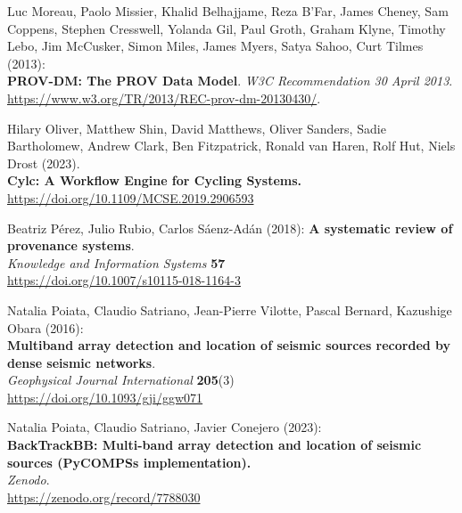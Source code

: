 \documentclass[10pt,letterpaper]{article}
\begin{document}
\begin{thebibliography}{10}
\begin{small}
Luc Moreau, Paolo Missier, Khalid Belhajjame, Reza B'Far, James Cheney, Sam Coppens, Stephen Cresswell, Yolanda Gil, Paul Groth, Graham Klyne, Timothy Lebo, Jim McCusker, Simon Miles, James Myers, Satya Sahoo, Curt Tilmes (2013):\\
\textbf{PROV-DM: The PROV Data Model}.
\emph{W3C Recommendation 30 April 2013}.\\
\url{https://www.w3.org/TR/2013/REC-prov-dm-20130430/}.

Hilary Oliver, Matthew Shin, David Matthews, Oliver Sanders, Sadie Bartholomew, Andrew Clark, Ben Fitzpatrick, Ronald van Haren, Rolf Hut, Niels Drost
(2023).\\
\textbf{Cylc: A Workflow Engine for Cycling Systems.}\\
\url{https://doi.org/10.1109/MCSE.2019.2906593}

Beatriz Pérez, Julio Rubio, Carlos Sáenz-Adán (2018):
\textbf{A systematic review of provenance systems}.\\
\emph{Knowledge and Information Systems} \textbf{57}\\
\url{https://doi.org/10.1007/s10115-018-1164-3} 

Natalia Poiata, Claudio Satriano, Jean-Pierre Vilotte, Pascal Bernard, Kazushige Obara (2016):\\
\textbf{Multiband array detection and location of seismic sources recorded by dense seismic networks}.\\
\emph{Geophysical Journal International} \textbf{205}(3)\\
\url{https://doi.org/10.1093/gji/ggw071}

Natalia Poiata, Claudio Satriano, Javier Conejero (2023):\\
\textbf{BackTrackBB: Multi-band array detection and location of seismic sources (PyCOMPSs implementation).}\\
\emph{Zenodo}.\\
\url{https://zenodo.org/record/7788030}


\end{small}
\end{thebibliography}
\end{document}
